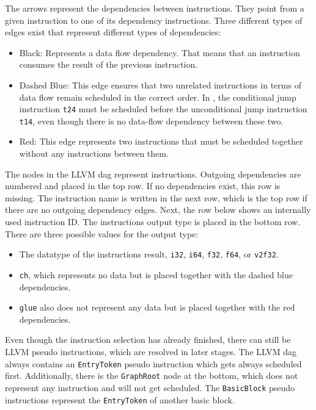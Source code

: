 The arrows represent the dependencies between instructions.
They point from a given instruction to one of its dependency instructions.
Three different types of edges exist that represent different types of dependencies:
\begin{itemize}
    \item Black: Represents a data flow dependency. That means that an instruction consumes the result of the previous instruction.
    \item Dashed Blue: This edge ensures that two unrelated instructions in terms of data flow remain scheduled in the correct order.
        In , the conditional jump instruction \lstinline|t24| must be scheduled before the unconditional jump instruction \lstinline|t14|, even though there is no data-flow dependency between these two.
    \item Red: This edge represents two instructions that must be scheduled together without any instructions between them.
\end{itemize}

The nodes in the LLVM \ac{dag} represent instructions.
Outgoing dependencies are numbered and placed in the top row.
If no dependencies exist, this row is missing.
The instruction name is written in the next row, which is the top row if there are no outgoing dependency edges.
Next, the row below shows an internally used instruction ID.
The instructions output type is placed in the bottom row. 
There are three possible values for the output type:
\begin{itemize}
    \item The datatype of the instructions result, \eg \lstinline|i32|, \lstinline|i64|, \lstinline|f32|, \lstinline|f64|, or \lstinline|v2f32|.
    \item \lstinline|ch|, which represents no data but is placed together with the dashed blue dependencies.
    \item \lstinline|glue| also does not represent any data but is placed together with the red dependencies.
\end{itemize}

Even though the instruction selection has already finished, there can still be LLVM pseudo instructions, which are resolved in later stages.
The LLVM \ac{dag} always contains an \lstinline|EntryToken| pseudo instruction which gets always scheduled first.
Additionally, there is the \lstinline|GraphRoot| node at the bottom, which does not represent any instruction and will not get scheduled.
The \lstinline|BasicBlock| pseudo instructions represent the \lstinline|EntryToken| of another basic block.


